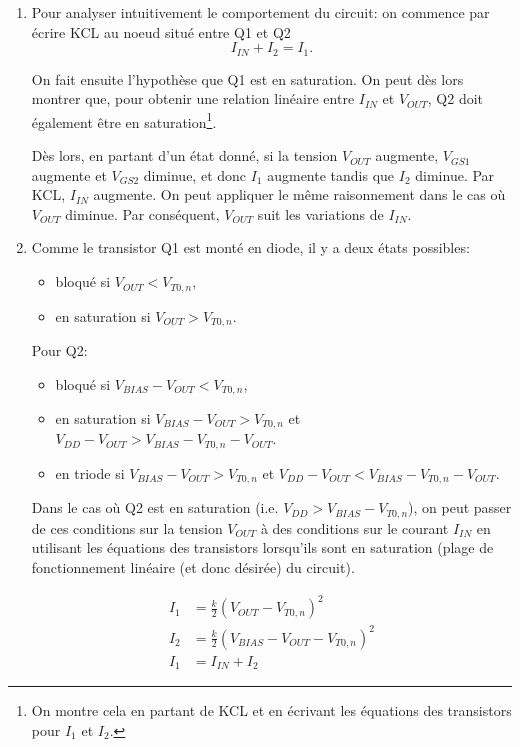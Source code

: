 \documentclass[frenchb,DIV=13]{scrartcl}
\begin{document}
\begin{enumerate}
	\item Pour analyser intuitivement le comportement du circuit: on commence par écrire KCL
	au noeud situé entre Q1 et Q2
	\[ I_{IN} + I_2 = I_1. \]
	
	On fait ensuite l'hypothèse que Q1 est en saturation. On peut dès lors montrer que, pour
	obtenir une relation linéaire entre $I_{IN}$ et $V_{OUT}$, Q2 doit également être en
	saturation\footnote{On montre cela en partant de KCL et en écrivant les équations
	des transistors pour $I_1$ et $I_2$.}.
	
	Dès lors, en partant d'un état donné, si la tension
	$V_{OUT}$ augmente, $V_{GS1}$ augmente et $V_{GS2}$ diminue, et donc $I_1$ augmente tandis
	que $I_2$ diminue. Par KCL, $I_{IN}$ augmente.
	On peut appliquer le même raisonnement dans le cas où $V_{OUT}$ diminue. Par conséquent,
	$V_{OUT}$ suit les variations de $I_{IN}$.
	
	\item Comme le transistor Q1 est monté en diode, il y a deux états possibles:
	\begin{itemize}
		\item bloqué si $V_{OUT} < V_{T0,n}$,
		\item en saturation si $V_{OUT} > V_{T0,n}$.
	\end{itemize}

	Pour Q2:
	\begin{itemize}
		\item bloqué si $V_{BIAS} - V_{OUT} < V_{T0,n}$,
		\item en saturation si $V_{BIAS} - V_{OUT} > V_{T0,n}$ et $V_{DD} - V_{OUT} > V_{BIAS} -
        V_{T0,n} - V_{OUT}$.
       	\item en triode si $V_{BIAS} - V_{OUT} > V_{T0,n}$ et $V_{DD} - V_{OUT} < V_{BIAS} - V_{T0,n} - V_{OUT}$.
	\end{itemize}

	Dans le cas où Q2 est en saturation (i.e. $V_{DD} > V_{BIAS} - V_{T0,n}$), on peut passer de ces conditions
	sur la tension $V_{OUT}$ à des conditions sur le courant $I_{IN}$ en utilisant les équations des transistors
	lorsqu'ils sont en saturation (plage de fonctionnement linéaire (et donc désirée) du circuit).

	\begin{align*}
    	I_1 &= \frac{k}{2}\left(V_{OUT} - V_{T0,n}\right)^2 \\
    	I_2 &= \frac{k}{2}\left(V_{BIAS} - V_{OUT} - V_{T0,n}\right)^2 \\
    	I_{1} &= I_{IN} + I_{2}
	\end{align*}
    

\end{enumerate}
\end{document}
